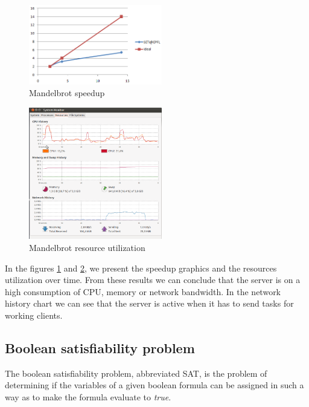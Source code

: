 \documentclass[letterpaper,twocolumn,10pt]{article}
\begin{document}
\begin{figure}[!ht]
\begin{center}
\includegraphics[width=220px]{../imgs/mandelbrot.png}
\end{center}
\caption{Mandelbrot speedup}
\label{fig:mandelbrotSU}
\end{figure}

\begin{figure}[!ht]
\begin{center}
\includegraphics[width=220px]{../imgs/ru-mandelbrot.png}
\end{center}
\caption{Mandelbrot resource utilization}
\label{fig:mandelbrotRU}
\end{figure}

In the figures \ref{fig:mandelbrotSU} and \ref{fig:mandelbrotRU}, we present
the speedup graphics and the resources utilization over time. From these results
we can conclude that the server is on a high consumption of CPU, memory or
network bandwidth. In the network history chart we can see that the server is
active when it has to send tasks for working clients.

\subsection{Boolean satisfiability problem}

The boolean satisfiability problem, abbreviated SAT, is the problem of
determining if the variables of a given boolean formula can be assigned in such
a way as to make the formula evaluate to \textit{true}.
\end{document}
